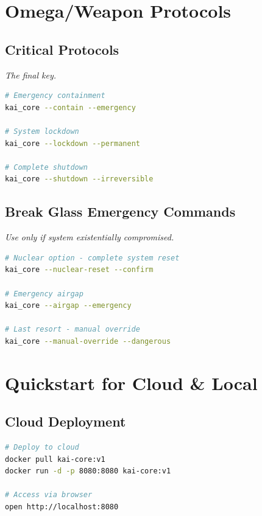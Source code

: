 \documentclass[11pt]{report}
\begin{document}
\chapter{Omega/Weapon Protocols}

\section{Critical Protocols}
\textit{The final key.}

\begin{lstlisting}[language=bash,caption={Critical Commands}]
# Emergency containment
kai_core --contain --emergency

# System lockdown
kai_core --lockdown --permanent

# Complete shutdown
kai_core --shutdown --irreversible
\end{lstlisting}

\section{Break Glass Emergency Commands}
\textit{Use only if system existentially compromised.}

\begin{lstlisting}[language=bash,caption={Break Glass Commands}]
# Nuclear option - complete system reset
kai_core --nuclear-reset --confirm

# Emergency airgap
kai_core --airgap --emergency

# Last resort - manual override
kai_core --manual-override --dangerous
\end{lstlisting}

\chapter{Quickstart for Cloud \& Local}

\section{Cloud Deployment}
\begin{lstlisting}[language=bash,caption={Cloud Setup}]
# Deploy to cloud
docker pull kai-core:v1
docker run -d -p 8080:8080 kai-core:v1

# Access via browser
open http://localhost:8080
\end{lstlisting}
\end{document}
